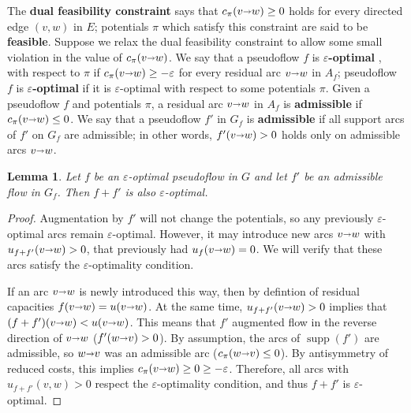 \documentclass[11pt]{article}
\makeatletter
\def\eps{\varepsilon}
\def\arcto{\mathord\shortrightarrow}
\def\arc#1#2{#1\arcto#2}
\def\supp{\operatorname{supp}}
\theoremstyle{plain}
\newtheorem{lemma}{Lemma}[section]
\numberwithin{figure}{section}
\def\EMPH#1{\textbf{\boldmath #1}}
\def\n@te#1{\textsf{\boldmath \textbf{$\langle\!\langle$#1$\rangle\!\rangle$}}\leavevmode}
\def\note#1{\textcolor{red}{\n@te{#1}}}
\makeatother
\begin{document}
The \EMPH{dual feasibility constraint} says that $c_\pi(\arc vw) \geq 0$ holds for every directed edge $(v,w)$ in $E$; potentials $\pi$ which satisfy this constraint are said to be \EMPH{feasible}.
%
%
Suppose we relax the dual feasibility constraint to allow some small violation in the value of $c_\pi(\arc vw)$.
We say that a pseudoflow $f$ is \EMPH{$\eps$-optimal} \cite{tar-spmcc-1985,be-darml-1987}, with respect to $\pi$ if
$c_\pi(\arc vw) \geq -\eps$ for every residual arc $\arc vw$ in $A_f$; pseudoflow $f$ is \EMPH{$\eps$-optimal} if it is $\eps$-optimal with respect to some potentials $\pi$.
%
Given a pseudoflow $f$ and potentials $\pi$, a residual arc $\arc vw$ in $A_f$ is
\EMPH{admissible} if $c_\pi(\arc vw) \leq 0$.
We say that a pseudoflow $f'$ in $G_f$ is \EMPH{admissible} if all support arcs of $f'$ on $G_f$ are admissible; in other words, $f'(\arc vw) > 0$ holds
only on admissible arcs $\arc vw$.

\begin{lemma}
Let $f$ be an $\eps$-optimal pseudoflow in $G$ and let $f'$ be an
admissible flow in $G_f$.
Then $f + f'$ is also $\eps$-optimal.
\end{lemma}

\begin{proof}
Augmentation by $f'$ will not change the potentials, so any previously
$\eps$-optimal arcs remain $\eps$-optimal.
However, it may introduce new arcs $\arc vw$ with $u_{f+f'}(\arc vw) > 0$, that previously had
$u_f(\arc vw) = 0$.
We will verify that these arcs satisfy the $\eps$-optimality condition.

If an arc $\arc vw$ is newly introduced this way, then by defintion of residual
capacities $f(\arc vw) = u(\arc vw)$.
At the same time, $u_{f+f'}(\arc vw) > 0$ implies that $(f+f')(\arc vw) < u(\arc vw)$.
This means that $f'$ augmented flow in the reverse direction of $\arc vw$
($f'(\arc wv) > 0$).
By assumption, the arcs of $\supp(f')$ are admissible, so $\arc wv$ was an
admissible arc ($c_\pi(\arc wv) \leq 0$).
By antisymmetry of reduced costs, this implies $c_\pi(\arc vw) \geq 0 \geq -\eps$.
Therefore, all arcs with $u_{f+f'}(v, w) > 0$ respect the $\eps$-optimality condition,
and thus $f+f'$ is $\eps$-optimal.
\end{proof}
\end{document}
